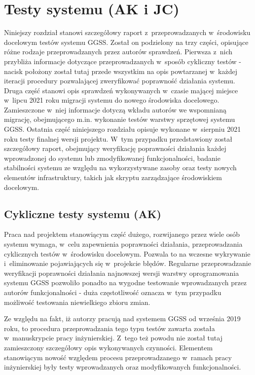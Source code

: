 \chapter{Testy systemu (AK i JC)}
\label{cha:tests}

\graphicspath{{6_tests/static/}}

Niniejszy rozdział stanowi szczegółowy raport z~przeprowadzanych w~środowisku docelowym testów systemu GGSS. Został on podzielony na trzy części, opisujące różne rodzaje przeprowadzanych przez autorów sprawdzeń. Pierwsza z~nich przybliża informacje dotyczące przeprowadzanych w~sposób cykliczny testów - nacisk położony został tutaj przede wszystkim na opis powtarzanej w~każdej iteracji procedury pozwalającej zweryfikować poprawność działania systemu. Druga część stanowi opis sprawdzeń wykonywanych w~czasie mającej miejsce w~lipcu 2021 roku migracji systemu do nowego środowiska docelowego. Zamieszczone w~niej informacje dotyczą wkładu autorów we wspomnianą migrację, obejmującego m.in. wykonanie testów warstwy sprzętowej systemu GGSS. Ostatnia część niniejszego rozdziału opisuje wykonane w~sierpniu 2021 roku testy finalnej wersji projektu. W~tym przypadku przedstawiony został szczegółowy raport, obejmujący weryfikację poprawności działania każdej wprowadzonej do systemu lub zmodyfikowanej funkcjonalności, badanie stabilności systemu ze względu na wykorzystywane zasoby oraz testy nowych elementów infrastruktury, takich jak skryptu zarządzające środowiskiem docelowym.

\section{Cykliczne testy systemu (AK)}
Praca nad projektem stanowiącym część dużego, rozwijanego przez wiele osób systemu wymaga, w~celu zapewnienia poprawności działania, przeprowadzania cyklicznych testów w~środowisku docelowym. Pozwala to na wczesne wykrywanie i~eliminowanie pojawiających się w~projekcie błędów. Regularne przeprowadzanie weryfikacji poprawności działania najnowszej wersji warstwy oprogramowania systemu GGSS pozwoliło ponadto na wygodne testowanie wprowadzanych przez autorów funkcjonalności - duża częstotliwość oznacza w~tym przypadku możliwość testowania niewielkiego zbioru zmian.

Ze względu na fakt, iż autorzy pracują nad systemem GGSS od września 2019 roku, to procedura przeprowadzania tego typu testów zawarta została w~manuskrypcie pracy inżynierskiej. Z~tego też powodu nie został tutaj zamieszczony szczegółowy opis wykonywanych czynności. Elementem stanowiącym nowość względem procesu przeprowadzanego w~ramach pracy inżynierskiej były testy wprowadzanych oraz modyfikowanych funkcjonalności. 

